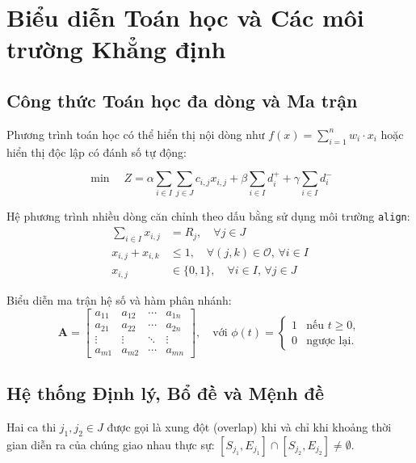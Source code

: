 \section{Biểu diễn Toán học và Các môi trường Khẳng định}
\label{sec:math}

\subsection{Công thức Toán học đa dòng và Ma trận}
Phương trình toán học có thể hiển thị nội dòng như $f(x) = \sum_{i=1}^n w_i \cdot x_i$ hoặc hiển thị độc lập có đánh số tự động:

\begin{equation}
\label{eq:objective}
\min \quad Z = \alpha \sum_{i \in I} \sum_{j \in J} c_{i,j} x_{i,j} + \beta \sum_{i \in I} d_i^+ + \gamma \sum_{i \in I} d_i^-
\end{equation}

Hệ phương trình nhiều dòng căn chỉnh theo dấu bằng sử dụng môi trường \texttt{align}:
\begin{align}
\sum_{i \in I} x_{i,j} &= R_j, \quad \forall j \in J \label{eq:capacity}\\
x_{i,j} + x_{i,k} &\le 1, \quad \forall (j, k) \in \mathcal{O}, \, \forall i \in I \label{eq:overlap}\\
x_{i,j} &\in \{0, 1\}, \quad \forall i \in I, \, \forall j \in J \label{eq:binary}
\end{align}

Biểu diễn ma trận hệ số và hàm phân nhánh:
\begin{equation}
\mathbf{A} = \begin{bmatrix}
a_{11} & a_{12} & \cdots & a_{1n} \\
a_{21} & a_{22} & \cdots & a_{2n} \\
\vdots & \vdots & \ddots & \vdots \\
a_{m1} & a_{m2} & \cdots & a_{mn}
\end{bmatrix}, \quad
\text{với } \phi(t) = \begin{cases}
1 & \text{nếu } t \ge 0, \\
0 & \text{ngược lại.}
\end{cases}
\end{equation}

\subsection{Hệ thống Định lý, Bổ đề và Mệnh đề}

\begin{definition}
Hai ca thi $j_1, j_2 \in J$ được gọi là xung đột (overlap) khi và chỉ khi khoảng thời gian diễn ra của chúng giao nhau thực sự:
$[S_{j_1}, E_{j_1}] \cap [S_{j_2}, E_{j_2}] \neq \emptyset$.
\end{definition}

